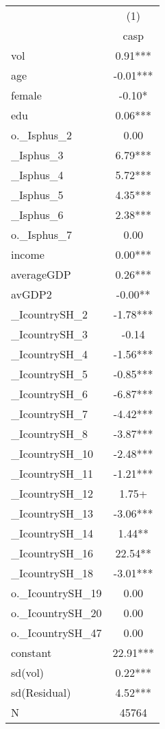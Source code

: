 {
\def\sym#1{\ifmmode^{#1}\else\(^{#1}\)\fi}
\begin{tabular}{l*{1}{c}}
\hline\hline
            &\multicolumn{1}{c}{(1)}\\
            &\multicolumn{1}{c}{casp}\\
\hline
vol         &        0.91***\\
age         &       -0.01***\\
female      &       -0.10*  \\
edu         &        0.06***\\
o.\_Isphus\_2 &        0.00   \\
\_Isphus\_3   &        6.79***\\
\_Isphus\_4   &        5.72***\\
\_Isphus\_5   &        4.35***\\
\_Isphus\_6   &        2.38***\\
o.\_Isphus\_7 &        0.00   \\
income      &        0.00***\\
averageGDP  &        0.26***\\
avGDP2      &       -0.00** \\
\_IcountrySH\_2&       -1.78***\\
\_IcountrySH\_3&       -0.14   \\
\_IcountrySH\_4&       -1.56***\\
\_IcountrySH\_5&       -0.85***\\
\_IcountrySH\_6&       -6.87***\\
\_IcountrySH\_7&       -4.42***\\
\_IcountrySH\_8&       -3.87***\\
\_IcountrySH\_10&       -2.48***\\
\_IcountrySH\_11&       -1.21***\\
\_IcountrySH\_12&        1.75+  \\
\_IcountrySH\_13&       -3.06***\\
\_IcountrySH\_14&        1.44** \\
\_IcountrySH\_16&       22.54** \\
\_IcountrySH\_18&       -3.01***\\
o.\_IcountrySH\_19&        0.00   \\
o.\_IcountrySH\_20&        0.00   \\
o.\_IcountrySH\_47&        0.00   \\
constant    &       22.91***\\
sd(vol)     &        0.22***\\
sd(Residual)&        4.52***\\
\hline
N           &       45764   \\
\hline\hline
\end{tabular}
}
